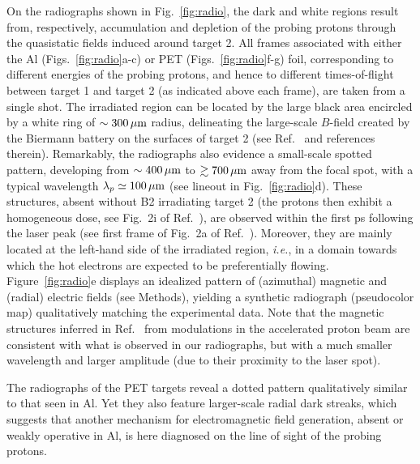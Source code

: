 \documentclass[aps,twocolumn,showpacs,superscriptaddress]{revtex4}
\begin{document}
On the radiographs shown in Fig.~\ref{fig:radio}, the dark and white regions result from, respectively, accumulation and depletion of the probing protons through the quasistatic fields induced around target 2.
All frames associated with either the Al (Figs.~\ref{fig:radio}a-c) or PET (Figs.~\ref{fig:radio}f-g) foil, corresponding to different energies of the probing protons, and hence to different times-of-flight between target 1 and target 2 (as indicated above each frame), are taken from a single shot.
The irradiated region can be located by the large black area encircled by a white ring of $\sim 300\,\rm \mu m$ radius, delineating the large-scale $B$-field created by the Biermann battery on the surfaces of target 2 (see Ref.~\cite{RSI_Albertazzi_2015} and references therein). Remarkably, the radiographs also evidence a small-scale spotted pattern, developing from $\sim 400\,\rm\mu m$ to $\gtrsim 700\,\rm \mu m$ away from the focal spot, with a typical wavelength  $\lambda_p \simeq 100\,\rm \mu m$ (see lineout in Fig.~\ref{fig:radio}d). These structures, absent without B2 irradiating target 2 (the protons then exhibit a homogeneous dose, see Fig.~2i of Ref.~\cite{RSI_Albertazzi_2015}), are observed within the first ps following the laser peak (see first frame of Fig.~2a of Ref.~\cite{RSI_Albertazzi_2015}). Moreover, they are mainly located at the left-hand side of the irradiated region, \emph{i.e.}, in a domain towards which the hot electrons are expected to be preferentially flowing. Figure~\ref{fig:radio}e displays an idealized pattern of (azimuthal) magnetic and (radial) electric fields (see Methods), yielding a synthetic radiograph (pseudocolor map) qualitatively matching the experimental data. Note that the magnetic structures inferred in Ref.~\cite{PRL_Gode_2017} from modulations in the accelerated proton beam are consistent with what is observed in our radiographs, but with a much smaller wavelength and larger amplitude (due to their proximity to the laser spot).

The radiographs of the PET targets reveal a dotted pattern qualitatively similar to that seen in Al. Yet they also feature larger-scale radial dark streaks, which suggests that another mechanism for electromagnetic field generation, absent or weakly operative in Al, is here diagnosed on the line of sight of the probing protons.
\end{document}
